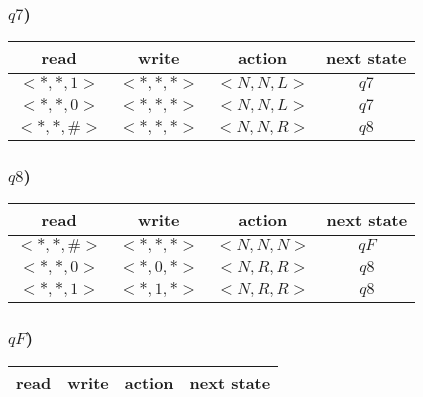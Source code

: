 \documentclass{article}
\begin{document}
\subsubsection*{$q7$)}

\begin{longtable}{c|c|c|c}
read & write & action & next state\\
\hline
$<*,*,1>$ & $<*,*,*>$ & $<N,N,L>$ & $q7$\\
$<*,*,0>$ & $<*,*,*>$ & $<N,N,L>$ & $q7$\\
$<*,*,\#>$ & $<*,*,*>$ & $<N,N,R>$ & $q8$\\
\end{longtable}

\subsubsection*{$q8$)}

\begin{longtable}{c|c|c|c}
read & write & action & next state\\
\hline
$<*,*,\#>$ & $<*,*,*>$ & $<N,N,N>$ & $qF$\\
$<*,*,0>$ & $<*,0,*>$ & $<N,R,R>$ & $q8$\\
$<*,*,1>$ & $<*,1,*>$ & $<N,R,R>$ & $q8$\\
\end{longtable}

\subsubsection*{$qF$)}

\begin{longtable}{c|c|c|c}
read & write & action & next state\\
\hline
\end{longtable}
\end{document}
